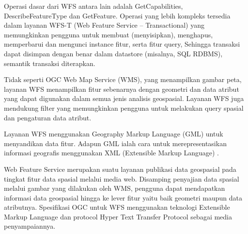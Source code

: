 Operasi dasar dari WFS antara lain adalah GetCapabilities, DescribeFeatureType dan GetFeature. Operasi yang lebih kompleks tersedia dalam layanan WFS-T (Web Feature Service – Transactional) yang memungkinkan pengguna untuk membuat (menyisipkan), menghapus, memperbarui dan mengunci instance fitur, serta fitur query, Sehingga transaksi dapat disimpan dengan benar dalam datastore (misalnya, SQL RDBMS), semantik transaksi diterapkan.

Tidak seperti OGC Web Map Service (WMS), yang menampilkan gambar peta, layanan WFS menampilkan fitur sebenarnya dengan geometri dan data atribut yang dapat digunakan dalam semua jenis analisis geospasial. Layanan WFS juga mendukung filter yang memungkinkan pengguna untuk melakukan query spasial dan pengaturan data atribut.

Layanan WFS menggunakan Geography Markup Language (GML) untuk menyandikan data fitur. Adapun GML ialah cara untuk merepresentasikan informasi geografis menggunakan XML (Extensible Markup Language) \cite{adityapeluang}.

Web Feature Service merupakan suatu layanan publikasi data geospasial pada tingkat fitur data spasial melalui media web. Disamping penyajian data spasial melalui gambar yang dilakukan oleh WMS, pengguna dapat mendapatkan informasi data geospasial hingga ke lever fitur yaitu baik geometri maupun data atributnya. Spesifikasi OGC untuk WFS menggunakan teknologi Extensible Markup Language dan protocol Hyper Text Transfer Protocol sebagai media penyampaiannya.


